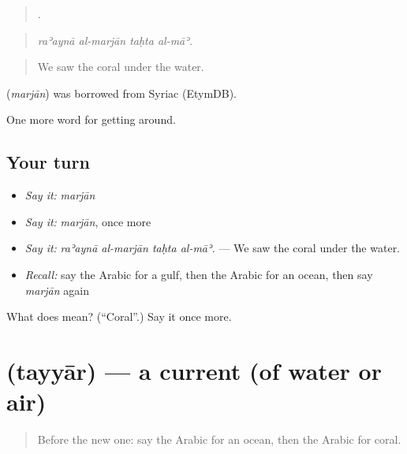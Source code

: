 \begin{quote}
   .
\end{quote}

\begin{quote}
\emph{raʾaynā al-marjān taḥta al-māʾ.}
\end{quote}

\begin{quote}
We saw the coral under the water.
\end{quote}

\begin{cousinweb}
\textbf{} (\emph{marjān}) was borrowed from Syriac (EtymDB).
\end{cousinweb}

\begin{grammarlens}[title={What you've built}]
One more word for getting around.
\end{grammarlens}

\subsection*{Your turn}
\begin{itemize}
\raggedright
  \item \emph{Say it:} \emph{marjān}
  \item \emph{Say it:} \emph{marjān}, once more
  \item \emph{Say it:} \emph{raʾaynā al-marjān taḥta al-māʾ.} — We saw the coral under the water.
  \item \emph{Recall:} say the Arabic for a gulf, then the Arabic for an ocean, then say \emph{marjān} again
\end{itemize}

\begin{tcolorbox}[breakable,colback=teal!4,colframe=teal!35!black,title={Before you move on}]
What does  mean? (\textquotedblleft{}Coral\textquotedblright{}.) Say it once more.
\end{tcolorbox}
\section[\texorpdfstring{\ar{تيار} (tayyār)}{تيار (tayyār)}]{ (tayyār) — a current (of water or air)}

\label{lesson:AR-C471-tayyar}



\begin{quote}
Before the new one: say the Arabic for an ocean, then the Arabic for coral.
\end{quote}

